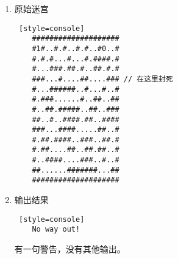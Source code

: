 \begin{enumerate}

    \item 原始迷宫
\begin{lstlisting} [style=console]
    ####################
    #1#..#.#..#.#..#0..#
    #.#.#...#...#.####.#
    #...###.##.#..##.#.#
    ###...#....##....### // 在这里封死
    #...######..#...#..#
    #.###......#..##..##
    #..##.#####..##..###
    ##..#..####.##..####
    ###...####.....##..#
    #.##.####..###..##.#
    #.##....##..##.##..#
    #..####....###..#..#
    ##......#######...##
    ####################
\end{lstlisting}


    \item 输出结果
\begin{lstlisting} [style=console]
    No way out!
\end{lstlisting}
    有一句警告，没有其他输出。

\end{enumerate}